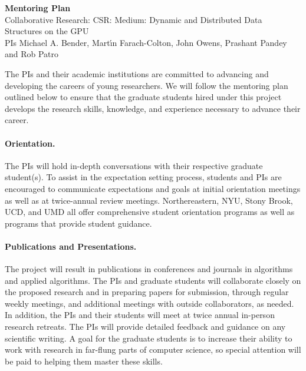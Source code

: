 




 

\thispagestyle{empty}

\begin{center}
   \textbf{Mentoring Plan}\\
 Collaborative Research: CSR: Medium: Dynamic and Distributed Data Structures on the GPU\\
 PIs Michael A. Bender, Mart\'{\i}n Farach-Colton, John Owens, Prashant Pandey and Rob Patro
\end{center}

The PIs and their academic institutions are committed to advancing and developing the careers of young researchers. We will follow the mentoring plan outlined below to ensure that the graduate students hired under this project develops the research skills, knowledge, and experience necessary
to advance their career.

\paragraph{Orientation.} The PIs will hold in-depth conversations with their respective graduate student(s). To assist in the expectation setting process, students and PIs are encouraged to communicate expectations and goals at initial orientation meetings as well as at twice-annual review meetings. Northereastern, NYU, Stony Brook, UCD, and UMD all offer comprehensive student orientation programs as well as programs that provide student guidance.

\paragraph{Publications and Presentations.} The project will result in publications in conferences and journals in algorithms and applied algorithms. The PIs and graduate students will collaborate closely on the proposed research and in preparing papers for submission, through regular weekly meetings, and additional meetings with outside collaborators, as needed. In addition, the PIs and their students will meet at twice annual in-person research retreats. The PIs will provide detailed feedback and guidance on any scientific writing. A goal for the graduate students is to increase their ability to work with research in far-flung parts of computer science, so special attention will be paid to helping them master these skills.


